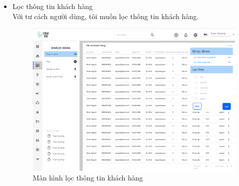 \documentclass[12pt,a4paper]{article}
\begin{document}
\begin{enumerate}
\begin{itemize}
            \item Lọc thông tin khách hàng \\
            Với tư cách người dùng, tôi muốn lọc thông tin khách hàng.

            \begin{figure}[H]
                \centering \includegraphics[width=\textwidth]{Img/Nguyet/Khachhang/lockhachhang.png}
                \vspace{0.5cm}
                \caption{Màn hình lọc thông tin khách hàng}
                \label{locKH}
            \end{figure}


\end{itemize}
\end{enumerate}
\end{document}
